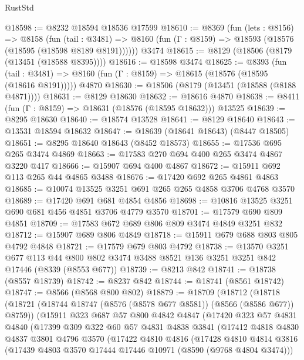 \begin{lexlean}{RustStd}
\begin{coremodule}
@18598 := @8232 @18594 @18536 @17599
@18610 := @8369
    (fun (lets : @8156) =>
    @8158
      (fun (tail : @3481) =>
      @8160 (fun (Γ : @8159) => @18593 (@18576 (@18595 (@18598 @8189 @8191))))))
    @3474
@18615 := @8129 (@18506 (@8179 (@13451 (@18588 @8395))))
@18616 := @18598 @3474
@18625 := @8393
    (fun (tail : @3481) => @8160 (fun (Γ : @8159) => @18615 (@18576 (@18595 (@18616 @8191)))))
    @4870
@18630 := @18506 (@8179 (@13451 (@18588 (@8188 @4871))))
@18631 := @8129 @18630
@18632 := @18616 @4870
@18638 := @8411 (fun (Γ : @8159) => @18631 (@18576 (@18595 @18632))) @13525
@18639 := @8295 @18630
@18640 := @18574 @13528
@18641 := @8129 @18640
@18643 := @13531 @18594 @18632
@18647 := @18639 (@18641 @18643) (@8447 @18505)
@18651 := @8295 @18640 @18643 (@8452 @18573)
@18655 := @17536 @695 @265 @3474 @4869
@18663 := @17583 @270 @694 @400 @265 @3474 @4867 @3220 @417
@18666 := @15907 @694 @400 @4867
@18672 := @15911 @692 @113 @265 @44 @4865 @3488
@18676 := @17420 @692 @265 @4861 @4863
@18685 := @10074 @13525 @3251 @691 @265 @265 @4858 @3706 @4768 @3570
@18689 := @17420 @691 @681 @4854 @4856
@18698 := @10816 @13525 @3251 @690 @681 @456 @4851 @3706 @4779 @3570
@18701 := @17579 @690 @809 @4851
@18709 := @17583 @672 @689 @806 @809 @3474 @4849 @3251 @832
@18712 := @15907 @689 @806 @4849
@18718 := @15911 @679 @688 @803 @805 @4792 @4848
@18721 := @17579 @679 @803 @4792
@18738 := @13570
    @3251
    @677
    @113
    @44
    @800
    @802
    @3474
    @3488
    @8521
    @136
    @3251
    @3251
    @842
    @17446
    (@8339 (@8553 @677))
@18739 := @8213 @842
@18741 := @18738 (@8557 @18739)
@18742 := @8237 @842
@18744 := @18741 (@8561 @18742)
@18747 := @8566 (@8568 @800 @802)
@18879 := @18709
    (@18712
      (@18718
        (@18721 (@18744 @18747 (@8576 (@8578 @677 @8581)) (@8566 (@8586 @677)) @8759))
        (@15911
          @323
          @687
          @57
          @800
          @4842
          @4847
          (@17420
            @323
            @57
            @4831
            @4840
            (@17399
              @309
              @322
              @60
              @57
              @4831
              @4838
              @3841
              (@17412
                @4818
                @4830
                @4837
                @3801
                @4796
                @3570
                (@17422
                  @4810
                  @4816
                  (@17428
                    @4810
                    @4814
                    @3816
                    (@17439 @4803 @3570 @17444 @17446 @10971 (@8590 (@9768 @4804 @3474)))

\end{coremodule}
\end{lexlean}
